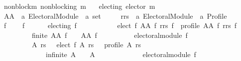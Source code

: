 \begin{isabellebody}
\ \ \ \ non{\isacharunderscore}{\kern0pt}block{\isacharunderscore}{\kern0pt}m{\isacharcolon}{\kern0pt}\ {\isachardoublequoteopen}non{\isacharunderscore}{\kern0pt}blocking\ m{\isachardoublequoteclose}\isanewline
\ \ \ {\isachardoublequoteopen}electing\ {\isacharparenleft}{\kern0pt}elector\ m{\isacharparenright}{\kern0pt}{\isachardoublequoteclose}\isanewline
%
\isadelimproof
%
\endisadelimproof
%
\isatagproof
{}\isamarkupfalse%
\ {\isacharminus}{\kern0pt}\isanewline
\ \ \isamarkupfalse%
\isanewline
\ \ \ \ AA\ {\isacharcolon}{\kern0pt}{\isacharcolon}{\kern0pt}\ {\isachardoublequoteopen}{\isacharprime}{\kern0pt}a\ Electoral{\isacharunderscore}{\kern0pt}Module\ {\isasymRightarrow}\ {\isacharprime}{\kern0pt}a\ set{\isachardoublequoteclose}\ \isanewline
\ \ \ \ rrs\ {\isacharcolon}{\kern0pt}{\isacharcolon}{\kern0pt}\ {\isachardoublequoteopen}{\isacharprime}{\kern0pt}a\ Electoral{\isacharunderscore}{\kern0pt}Module\ {\isasymRightarrow}\ {\isacharprime}{\kern0pt}a\ Profile{\isachardoublequoteclose}\ \isanewline
\ \ \ \ f{}{\isacharcolon}{\kern0pt}\isanewline
\ \ \ \ {\isachardoublequoteopen}{\isasymforall}f{\isachardot}{\kern0pt}\isanewline
\ \ \ \ \ \ {\isacharparenleft}{\kern0pt}electing\ f\ {\isasymor}\isanewline
\ \ \ \ \ \ \ \ {\isacharbraceleft}{\kern0pt}{\isacharbraceright}{\kern0pt}\ {\isacharequal}{\kern0pt}\ elect\ f\ {\isacharparenleft}{\kern0pt}AA\ f{\isacharparenright}{\kern0pt}\ {\isacharparenleft}{\kern0pt}rrs\ f{\isacharparenright}{\kern0pt}\ {\isasymand}\ profile\ {\isacharparenleft}{\kern0pt}AA\ f{\isacharparenright}{\kern0pt}\ {\isacharparenleft}{\kern0pt}rrs\ f{\isacharparenright}{\kern0pt}\ {\isasymand}\isanewline
\ \ \ \ \ \ \ \ \ \ \ \ finite\ {\isacharparenleft}{\kern0pt}AA\ f{\isacharparenright}{\kern0pt}\ {\isasymand}\ {\isacharbraceleft}{\kern0pt}{\isacharbraceright}{\kern0pt}\ {\isasymnoteq}\ AA\ f\ {\isasymor}\isanewline
\ \ \ \ \ \ \ \ {\isasymnot}\ electoral{\isacharunderscore}{\kern0pt}module\ f{\isacharparenright}{\kern0pt}\ {\isasymand}\isanewline
\ \ \ \ \ \ \ \ \ \ \ \ {\isacharparenleft}{\kern0pt}{\isacharparenleft}{\kern0pt}{\isasymforall}A\ rs{\isachardot}{\kern0pt}\ {\isacharbraceleft}{\kern0pt}{\isacharbraceright}{\kern0pt}\ {\isasymnoteq}\ elect\ f\ A\ rs\ {\isasymor}\ {\isasymnot}\ profile\ A\ rs\ {\isasymor}\isanewline
\ \ \ \ \ \ \ \ \ \ \ \ \ \ \ \ infinite\ A\ {\isasymor}\ {\isacharbraceleft}{\kern0pt}{\isacharbraceright}{\kern0pt}\ {\isacharequal}{\kern0pt}\ A{\isacharparenright}{\kern0pt}\ {\isasymand}\isanewline
\ \ \ \ \ \ \ \ \ \ \ \ electoral{\isacharunderscore}{\kern0pt}module\ f\ {\isasymor}\isanewline

\end{isabellebody}
